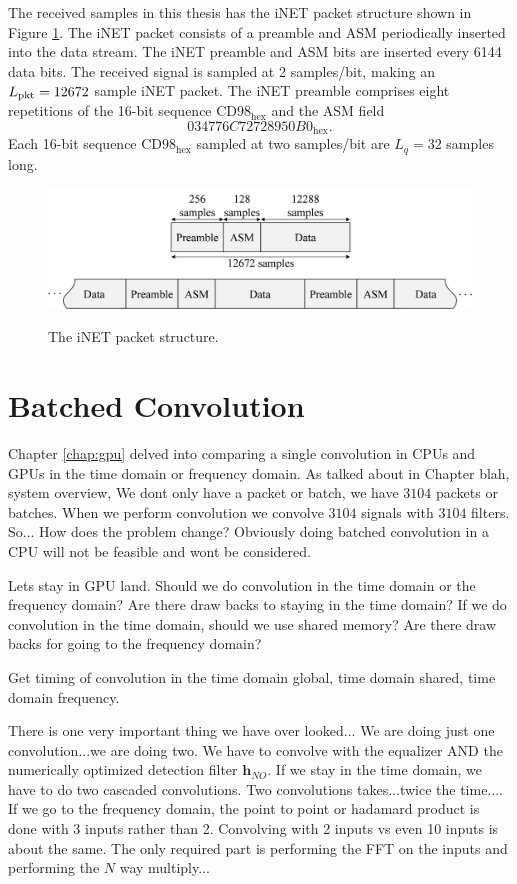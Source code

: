 The received samples in this thesis has the iNET packet structure shown in Figure \ref{fig:packet}.
The iNET packet consists of a preamble and ASM periodically inserted into the data stream.
The iNET preamble and ASM bits are inserted every 6144 data bits.
The received signal is sampled at 2 samples/bit, making an $L_\text{pkt}=12672$ sample iNET packet.
The iNET preamble comprises eight repetitions of the 16-bit sequence $\text{CD98}_\text{hex}$ and the ASM field
\begin{equation}
034776C72728950B0_\text{hex}.
\end{equation}
Each 16-bit sequence $\text{CD98}_\text{hex}$ sampled at two samples/bit are $L_q=32$ samples long.
\begin{figure}
	\caption{The iNET packet structure.}
	\centering\includegraphics[width=9.47in/100*55]{figures/systemOverview/packetStructure.pdf}
	\label{fig:packet}
\end{figure}


\section{Batched Convolution}
Chapter \ref{chap:gpu} delved into comparing a single convolution in CPUs and GPUs in the time domain or frequency domain.
As talked about in Chapter blah, system overview, We dont only have a packet or batch, we have $3104$ packets or batches.
When we perform convolution we convolve $3104$ signals with $3104$ filters.
So...
How does the problem change?
Obviously doing batched convolution in a CPU will not be feasible and wont be considered.

Lets stay in GPU land.
Should we do convolution in the time domain or the frequency domain?
Are there draw backs to staying in the time domain? 
If we do convolution in the time domain, should we use shared memory?
Are there draw backs for going to the frequency domain? 

Get timing of convolution in the time domain global, time domain shared, time domain frequency.

There is one very important thing we have over looked...
We are doing just one convolution...we are doing two.
We have to convolve with the equalizer AND the numerically optimized detection filter $\mathbf{h}_{NO}$.
If we stay in the time domain, we have to do two cascaded convolutions.
Two convolutions takes...twice the time....
If we go to the frequency domain, the point to point or hadamard product is done with 3 inputs rather than 2.
Convolving with 2 inputs vs even 10 inputs is about the same.
The only required part is performing the FFT on the inputs and performing the $N$ way multiply...

